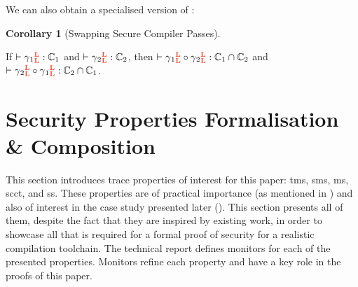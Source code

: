 \documentclass[acmsmall]{acmart}
\theoremstyle{definition}
\newtheorem{corollary}{Corollary}[section]
\begin{document}
We can also obtain a specialised version of :
% 

\begin{corollary}[Swapping Secure Compiler Passes]\label{corr:swappable:one}
  $\;$ 

  If {$\rtp{\cc[_{1}]{\trg{L}}{\trg{L}}}{\class[_{1}]}$ and $\rtp{\cc[_{2}]{\trg{L}}{\trg{L}}}{\class[_{2}]}$}, then {$\rtp{\cc[_{1}]{\trg{L}}{\trg{L}}\circ\cc[_{2}]{\trg{L}}{\trg{L}}}{\class[_{1}]\cap\class[_{2}]}$ and $\rtp{\cc[_{2}]{\trg{L}}{\trg{L}}\circ\cc[_{1}]{\trg{L}}{\trg{L}}}{\class[_{2}]\cap\class[_{1}]}$}. \Coqed
\end{corollary}

\section{Security Properties Formalisation \& Composition}\label{sec:compprop}

This section introduces trace properties of interest for this paper: \gls*{tms}, \gls*{sms}, \gls*{ms}, \gls*{scct}, and \gls*{ss}.
These properties are of practical importance (as mentioned in ) and also of interest in the case study presented later (). 
This section presents all of them, despite the fact that they are inspired by existing work, in order to showcase all that is required for a formal proof of security for a realistic compilation toolchain.
The technical report defines monitors for each of the presented properties.
% 
Monitors refine each property and have a key role in the proofs of this paper.
\end{document}
